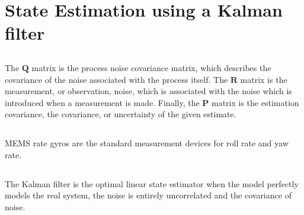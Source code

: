 \section{State Estimation using a Kalman filter}

\subsection{} %
The $\mathbf{Q}$ matrix is the process noise covariance matrix, which describes the covariance of the noise associated with the process itself.  The $\mathbf{R}$ matrix is the measurement, or observation, noise, which is associated with the noise which is introduced when a measurement is made. Finally, the $\mathbf{P}$ matrix is the estimation covariance, the covariance, or uncertainty of the given estimate.


\subsection{} %
MEMS rate gyros are the standard measurement devices for roll rate and yaw rate. 





\subsection{} %
The Kalman filter is the optimal linear state estimator when the model perfectly models the real system, the noise is entirely uncorrelated and the covariance of noise. 


\subsection{} %


